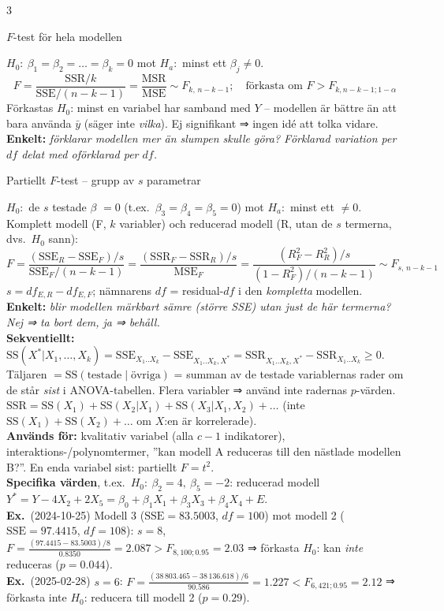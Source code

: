 \documentclass[8pt]{extarticle}
\makeatletter
\newcounter{sect}
\newcommand{\sect}[3][hd]{\par\vspace{1.5pt}\refstepcounter{sect}\noindent
  {\setlength{\fboxsep}{1.8pt}\colorbox{#1}{\parbox{\dimexpr\linewidth-2\fboxsep}{\color{white}\sffamily\bfseries
  \strut\thesect\enspace #2}}}\label{#3}\par\nobreak\vspace{0.8pt}\@afterheading}
\newcommand{\ex}{{\color{ex}\sffamily\bfseries Ex.}\ }
\newcommand{\enk}[1]{{\color{cEnk}\sffamily\bfseries Enkelt:} {\itshape #1}}
\newcommand{\SSE}{\mathrm{SSE}}
\newcommand{\SSR}{\mathrm{SSR}}
\newcommand{\MSE}{\mathrm{MSE}}
\newcommand{\MSR}{\mathrm{MSR}}
\newcommand{\SSq}{\mathrm{SS}}
\makeatother
\begin{document}
\begin{multicols*}{3}
\sect[cInfer]{$F$-test för hela modellen}{sec:F}
$H_0{:}\ \beta_1=\beta_2=\dots=\beta_k=0$ mot $H_a{:}$ minst ett $\beta_j\neq0$.
\[F=\frac{\SSR/k}{\SSE/(n-k-1)}=\frac{\MSR}{\MSE}\sim F_{k,\,n-k-1};\quad\text{förkasta om } F>F_{k,n-k-1;1-\alpha}\]
Förkastas $H_0$: minst en variabel har samband med $Y$ – modellen är bättre än att bara använda $\bar y$ (säger inte \emph{vilka}). Ej signifikant ⇒ ingen idé att tolka vidare. \enk{förklarar modellen mer än slumpen skulle göra? Förklarad variation per $df$ delat med oförklarad per $df$.}

\sect[cInfer]{Partiellt $F$-test – grupp av $s$ parametrar}{sec:partF}
$H_0{:}$ de $s$ testade $\beta$ $=0$ (t.ex.\ $\beta_3=\beta_4=\beta_5=0$) mot $H_a{:}$ minst ett $\neq0$. Komplett modell (F, $k$ variabler) och reducerad modell (R, utan de $s$ termerna, dvs.\ $H_0$ sann):
\[F=\frac{(\SSE_R-\SSE_F)/s}{\SSE_F/(n-k-1)}=\frac{(\SSR_F-\SSR_R)/s}{\MSE_F}=\frac{(R^2_F-R^2_R)/s}{(1-R^2_F)/(n-k-1)}\sim F_{s,\,n-k-1}\]
$s=df_{E,R}-df_{E,F}$; nämnarens $df$ = residual-$df$ i den \emph{kompletta} modellen. \enk{blir modellen märkbart sämre (större SSE) utan just de här termerna? Nej ⇒ ta bort dem, ja ⇒ behåll.}\\
\textbf{Sekventiellt:} $\SSq(X^*|X_1,\dots,X_k)=\SSE_{X_1..X_k}-\SSE_{X_1..X_k,X^*}=\SSR_{X_1..X_k,X^*}-\SSR_{X_1..X_k}\ge0$. Täljaren $=\SSq(\text{testade}\mid\text{övriga})$ = summan av de testade variablernas rader om de står \emph{sist} i ANOVA-tabellen. Flera variabler ⇒ använd inte radernas $p$-värden.
$\SSR=\SSq(X_1)+\SSq(X_2|X_1)+\SSq(X_3|X_1,X_2)+\dots$ (inte $\SSq(X_1)+\SSq(X_2)+\dots$ om $X$:en är korrelerade).\\
\textbf{Används för:} kvalitativ variabel (alla $c-1$ indikatorer), interaktions-/polynomtermer, ”kan modell A reduceras till den nästlade modellen B?”. En enda variabel sist: partiellt $F=t^2$.\\
\textbf{Specifika värden}, t.ex.\ $H_0{:}\ \beta_2=4,\ \beta_5=-2$: reducerad modell $Y^*=Y-4X_2+2X_5=\beta_0+\beta_1X_1+\beta_3X_3+\beta_4X_4+E$.\\
\ex (2024-10-25) Modell 3 ($\SSE=83.5003$, $df=100$) mot modell 2 ($\SSE=97.4415$, $df=108$): $s=8$, $F=\frac{(97.4415-83.5003)/8}{0.8350}=2.087>F_{8,100;0.95}=2.03$ ⇒ förkasta $H_0$: kan \emph{inte} reduceras ($p=0.044$).\\
\ex (2025-02-28) $s=6$: $F=\frac{(38\,803.465-38\,136.618)/6}{90.586}=1.227<F_{6,421;0.95}=2.12$ ⇒ förkasta inte $H_0$: reducera till modell 2 ($p=0.29$).


\end{multicols*}
\end{document}
